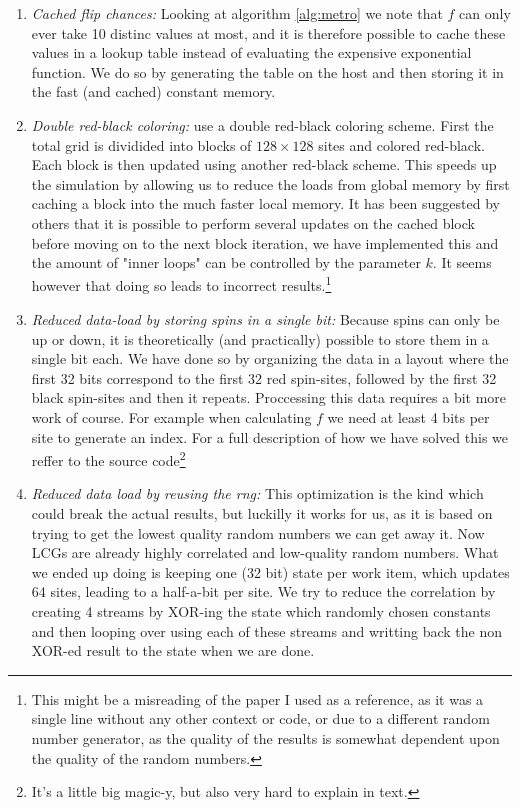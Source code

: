   \begin{enumerate}
    \item{{\em Cached flip chances: }Looking at algorithm \ref{alg:metro} we note that $f$ can only ever take 10 distinc values at most, and it is therefore possible to cache these values in a lookup table instead of evaluating the expensive exponential function.
    We do so by generating the table on the host and then storing it in the fast (and cached) constant memory.}
    \item{{\em Double red-black coloring:} use a double red-black coloring scheme. First the total grid is dividided into blocks of $128\times128$ sites and colored red-black. Each block is then updated using another red-black scheme.
    This speeds up the simulation by allowing us to reduce the loads from global memory by first caching a block into the much faster local memory. It has been suggested by others that it is possible to perform several updates on the cached block before moving on to the
    next block iteration, we have implemented this and the amount of "inner loops" can be controlled by the parameter $k$. It seems however that doing so leads to incorrect results.\footnote{This might be a misreading of the paper I used as a reference, as it was a single line without any other context or code, or due to
    a different random number generator, as the quality of the results is somewhat dependent upon the quality of the random numbers.}}
    \item{{\em Reduced data-load by storing spins in a single bit: } Because spins can only be up or down, it is theoretically (and practically) possible to store them in a single bit each. We have done so by organizing the data in a layout
    where the first 32 bits correspond to the first 32 red spin-sites, followed by the first 32 black spin-sites and then it repeats. Proccessing this data requires a bit more work of course. For example when calculating $f$ we need at least 4 bits per site to generate an index.
    For a full description of how we have solved this we reffer to the source code\footnote{It's a little big magic-y, but also very hard to explain in text.}
    }
    \item{{\em Reduced data load by reusing the rng:} This optimization is the kind which could break the actual results, but luckilly it works for us, as it is based on trying to get the lowest quality random numbers we can get away it.
    Now LCGs are already highly correlated and low-quality random numbers. What we ended up doing is keeping one (32 bit) state per work item, which updates 64 sites, leading to a half-a-bit per site. We try to reduce the correlation by creating 4 streams by XOR-ing the state which randomly chosen constants and then looping over using each of these streams
    and writting back the non XOR-ed result to the state when we are done.}
  \end{enumerate}
